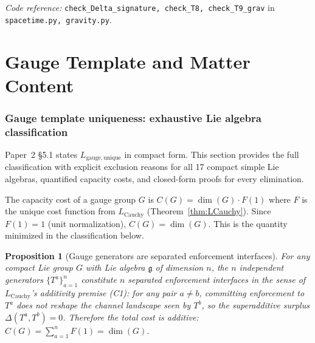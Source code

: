 \documentclass[11pt,a4paper]{article}
\newtheorem{proposition}[theorem]{Proposition}
\theoremstyle{definition}
\newcommand{\coderef}[2]{\smallskip\noindent\textit{Code reference:} \texttt{#1} in \texttt{#2}.}
\begin{document}
\coderef{check\_Delta\_signature, check\_T8, check\_T9\_grav}{spacetime.py, gravity.py}


\newpage


\part{Gauge Template and Matter Content}
\label{part:gauge}


\section{Gauge template uniqueness: exhaustive Lie algebra classification}
\label{sec:gauge_class_supp}

Paper~2 \S5.1 states $L_{\mathrm{gauge,unique}}$ in compact form.
This section provides the full classification with explicit exclusion
reasons for all 17 compact simple Lie algebras, quantified capacity
costs, and closed-form proofs for every elimination.

The capacity cost of a gauge group $G$ is $C(G) = \dim(G) \cdot F(1)$
where $F$ is the unique cost function from $L_{\mathrm{Cauchy}}$
(Theorem~\ref{thm:LCauchy}).  Since $F(1) = 1$ (unit normalization),
$C(G) = \dim(G)$.  This is the quantity minimized in the classification
below.

\begin{proposition}[Gauge generators are separated enforcement interfaces]\label{prop:generator_separation}
For any compact Lie group $G$ with Lie algebra $\mathfrak{g}$ of dimension
$n$, the $n$ independent generators $\{T^a\}_{a=1}^n$ constitute $n$
\emph{separated} enforcement interfaces in the sense of
$L_{\mathrm{Cauchy}}$'s additivity premise (C1): for any pair $a \ne b$,
committing enforcement to $T^a$ does not reshape the channel landscape
seen by $T^b$, so the superadditive surplus $\Delta(T^a, T^b) = 0$.
Therefore the total cost is additive: $C(G) = \sum_{a=1}^n F(1) = \dim(G)$.
\end{proposition}
\end{document}
